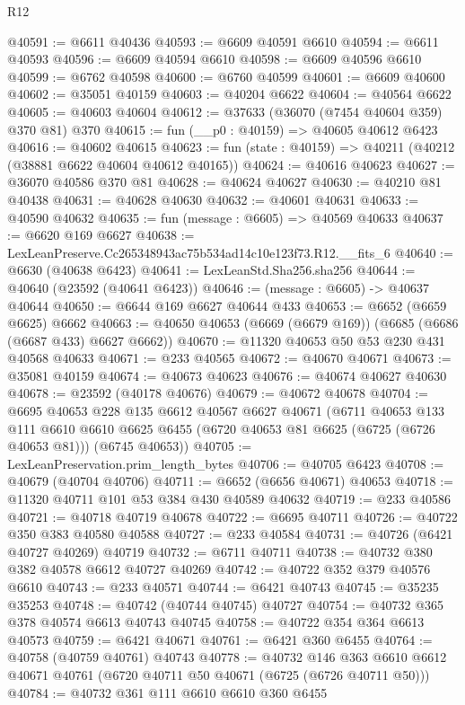 \begin{lexlean}{R12}
\begin{coremodule}
@40591 := @6611 @40436
@40593 := @6609 @40591 @6610
@40594 := @6611 @40593
@40596 := @6609 @40594 @6610
@40598 := @6609 @40596 @6610
@40599 := @6762 @40598
@40600 := @6760 @40599
@40601 := @6609 @40600
@40602 := @35051 @40159
@40603 := @40204 @6622
@40604 := @40564 @6622
@40605 := @40603 @40604
@40612 := @37633 (@36070 (@7454 @40604 @359) @370 @81) @370
@40615 := fun (__p0 : @40159) => @40605 @40612 @6423
@40616 := @40602 @40615
@40623 := fun (state : @40159) => @40211 (@40212 (@38881 @6622 @40604 @40612 @40165))
@40624 := @40616 @40623
@40627 := @36070 @40586 @370 @81
@40628 := @40624 @40627
@40630 := @40210 @81 @40438
@40631 := @40628 @40630
@40632 := @40601 @40631
@40633 := @40590 @40632
@40635 := fun (message : @6605) => @40569 @40633
@40637 := @6620 @169 @6627
@40638 := LexLeanPreserve.Cc265348943ac75b534ad14c10e123f73.R12.__fits_6
@40640 := @6630 (@40638 @6423)
@40641 := LexLeanStd.Sha256.sha256
@40644 := @40640 (@23592 (@40641 @6423))
@40646 := (message : @6605) -> @40637 @40644
@40650 := @6644 @169 @6627 @40644 @433
@40653 := @6652 (@6659 @6625) @6662
@40663 := @40650 @40653 (@6669 (@6679 @169)) (@6685 (@6686 (@6687 @433) @6627 @6662))
@40670 := @11320 @40653 @50 @53 @230 @431 @40568 @40633
@40671 := @233 @40565
@40672 := @40670 @40671
@40673 := @35081 @40159
@40674 := @40673 @40623
@40676 := @40674 @40627 @40630
@40678 := @23592 (@40178 @40676)
@40679 := @40672 @40678
@40704 := @6695
    @40653
    @228
    @135
    @6612
    @40567
    @6627
    @40671
    (@6711
      @40653
      @133
      @111
      @6610
      @6610
      @6625
      @6455
      (@6720 @40653 @81 @6625 (@6725 (@6726 @40653 @81)))
      (@6745 @40653))
@40705 := LexLeanPreservation.prim_length_bytes
@40706 := @40705 @6423
@40708 := @40679 (@40704 @40706)
@40711 := @6652 (@6656 @40671) @40653
@40718 := @11320 @40711 @101 @53 @384 @430 @40589 @40632
@40719 := @233 @40586
@40721 := @40718 @40719 @40678
@40722 := @6695 @40711
@40726 := @40722 @350 @383 @40580 @40588
@40727 := @233 @40584
@40731 := @40726 (@6421 @40727 @40269) @40719
@40732 := @6711 @40711
@40738 := @40732 @380 @382 @40578 @6612 @40727 @40269
@40742 := @40722 @352 @379 @40576 @6610
@40743 := @233 @40571
@40744 := @6421 @40743
@40745 := @35235 @35253
@40748 := @40742 (@40744 @40745) @40727
@40754 := @40732 @365 @378 @40574 @6613 @40743 @40745
@40758 := @40722 @354 @364 @6613 @40573
@40759 := @6421 @40671
@40761 := @6421 @360 @6455
@40764 := @40758 (@40759 @40761) @40743
@40778 := @40732
    @146
    @363
    @6610
    @6612
    @40671
    @40761
    (@6720 @40711 @50 @40671 (@6725 (@6726 @40711 @50)))
@40784 := @40732 @361 @111 @6610 @6610 @360 @6455

\end{coremodule}
\end{lexlean}
